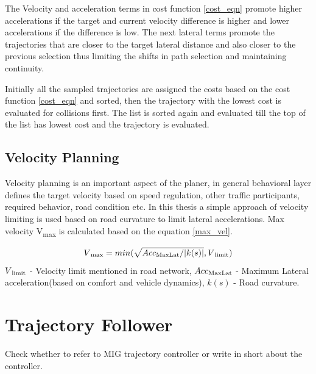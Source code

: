 The Velocity and acceleration terms in cost function \ref{cost_eqn} promote higher accelerations if the target and current velocity difference is higher and lower accelerations if the difference is low. The next lateral terms promote the trajectories that are closer to the target lateral distance and also closer to the previous selection thus limiting the shifts in path selection and maintaining continuity. 

Initially all the sampled trajectories are assigned the costs based on the cost function \ref{cost_eqn} and sorted, then the trajectory with the lowest cost is evaluated for collisions first. The list is sorted again and evaluated till the top of the list has lowest cost and the trajectory is evaluated. 

\subsection{Velocity Planning}
Velocity planning is an important aspect of the planer, in general behavioral layer defines the target velocity based on speed regulation, other traffic participants, required behavior, road condition etc. In this thesis a simple approach of velocity limiting is used based on road curvature to limit lateral accelerations. Max velocity  V\textsubscript{max} is calculated based on the equation \ref{max_vel}. 

\begin{equation}
    V\textsubscript{max} = min(\sqrt{Acc\textsubscript{MaxLat} / |k(s)|} , V\textsubscript{limit})
\label{max_vel}
\end{equation}
$V\textsubscript{limit}$ - Velocity limit mentioned in road network,
$Acc\textsubscript{MaxLat}$ - Maximum Lateral acceleration(based on comfort and vehicle dynamics),
$k(s)$ - Road curvature.

\section{Trajectory Follower} \label{traj_follower}

Check whether to refer to MIG trajectory controller or write in short about the controller. 
